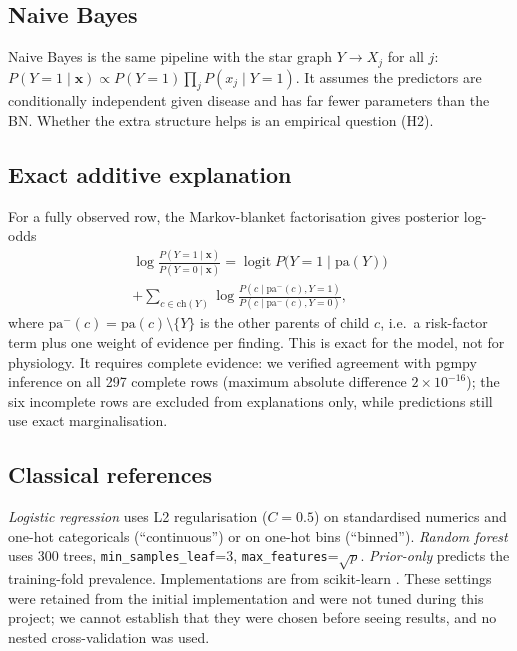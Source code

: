 \documentclass[conference]{IEEEtran}
\begin{document}
\subsection{Naive Bayes}
Naive Bayes is the same pipeline with the star graph $Y\rightarrow X_j$ for all $j$:
$P(Y{=}1\mid\mathbf{x})\propto P(Y{=}1)\prod_j P(x_j\mid Y{=}1)$. It assumes the predictors are conditionally independent given disease and has far fewer parameters than the BN. Whether the extra structure helps is an empirical question (H2).

\subsection{Exact additive explanation}
For a fully observed row, the Markov-blanket factorisation gives posterior log-odds
\begin{multline}
\log\frac{P(Y{=}1\mid\mathbf{x})}{P(Y{=}0\mid\mathbf{x})}
=\operatorname{logit}P\bigl(Y{=}1\mid\mathrm{pa}(Y)\bigr)\\
+\sum_{c\in\mathrm{ch}(Y)}\log\frac{P(c\mid \mathrm{pa}^{-}(c),Y{=}1)}{P(c\mid \mathrm{pa}^{-}(c),Y{=}0)},
\end{multline}
where $\mathrm{pa}^{-}(c)=\mathrm{pa}(c)\setminus\{Y\}$ is the other parents of child $c$,
i.e.\ a risk-factor term plus one weight of evidence per finding. This is exact for the model, not for physiology. It requires complete evidence: we verified agreement with pgmpy inference on all 297 complete rows (maximum absolute difference $2\times10^{-16}$); the six incomplete rows are excluded from explanations only, while predictions still use exact marginalisation.

\subsection{Classical references}
\emph{Logistic regression} uses L2 regularisation ($C=0.5$) on standardised numerics and one-hot categoricals (``continuous'') or on one-hot bins (``binned''). \emph{Random forest} \cite{breiman2001} uses 300 trees, \texttt{min\_samples\_leaf}=3, \texttt{max\_features}=$\sqrt{p}$. \emph{Prior-only} predicts the training-fold prevalence. Implementations are from scikit-learn \cite{pedregosa2011}. These settings were retained from the initial implementation and were not tuned during this project; we cannot establish that they were chosen before seeing results, and no nested cross-validation was used.

\end{document}
